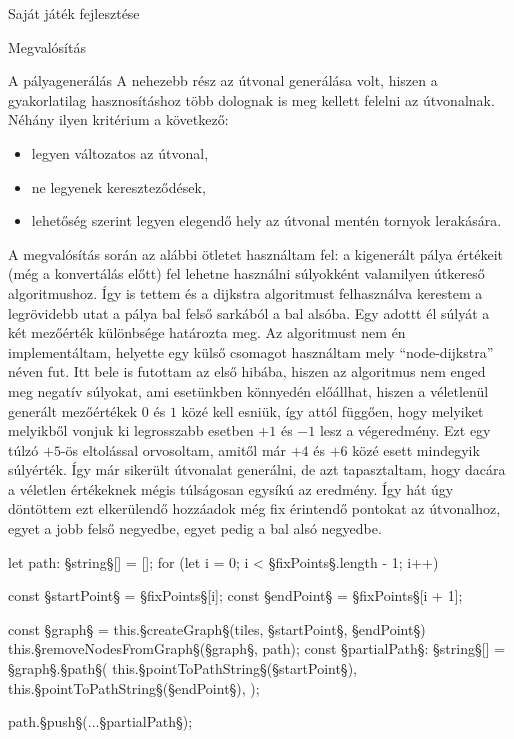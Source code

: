 \begin{MyChapter}{Saját játék fejlesztése}
\begin{MySection}{Megvalósítás}
\begin{MySubSection}{A pályagenerálás}
			A nehezebb rész az útvonal generálása volt, hiszen a gyakorlatilag hasznosításhoz több dolognak is meg kellett felelni az útvonalnak. Néhány ilyen kritérium a következő:
			\begin{itemize}
				\item legyen változatos az útvonal,
				\item ne legyenek kereszteződések,
				\item lehetőség szerint legyen elegendő hely az útvonal mentén tornyok lerakására.
			\end{itemize}
			A megvalósítás során az alábbi ötletet használtam fel: a kigenerált pálya értékeit (még a konvertálás előtt) fel lehetne használni súlyokként valamilyen útkereső algoritmushoz. Így is tettem és a dijkstra algoritmust felhasználva kerestem a legrövidebb utat a pálya bal felső sarkából a bal alsóba. Egy adottt él súlyát a két mezőérték különbsége határozta meg. Az algoritmust nem én implementáltam, helyette egy külső csomagot használtam mely ``node-dijkstra'' néven fut. Itt bele is futottam az első hibába, hiszen az algoritmus nem enged meg negatív súlyokat, ami esetünkben könnyedén előállhat, hiszen a véletlenül generált mezőértékek $0$ és $1$ közé kell esniük, így attól függően, hogy melyiket melyikből vonjuk ki legrosszabb esetben $+1$ és $-1$ lesz a végeredmény. Ezt egy túlzó $+5$-ös eltolással orvosoltam, amitől már $+4$ és $+6$ közé esett mindegyik súlyérték. Így már sikerült útvonalat generálni, de azt tapasztaltam, hogy dacára a véletlen értékeknek mégis túlságosan egysíkú az eredmény. Így hát úgy döntöttem ezt elkerülendő hozzáadok még fix érintendő pontokat az útvonalhoz, egyet a jobb felső negyedbe, egyet pedig a bal alsó negyedbe. 
			\begin{javascript}
let path: §\color{jsType}string§[] = [];
for (let i = 0; i < §\color{jsConst}fixPoints§.length - 1; i++) {
	const §\color{jsConst}startPoint§ = §\color{jsConst}fixPoints§[i];
	const §\color{jsConst}endPoint§ = §\color{jsConst}fixPoints§[i + 1];
	
	const §\color{jsConst}graph§ = this.§\color{jsMethod}createGraph§(tiles, §\color{jsConst}startPoint§, §\color{jsConst}endPoint§)
	this.§\color{jsMethod}removeNodesFromGraph§(§\color{jsConst}graph§, path);
	const §\color{jsConst}partialPath§: §\color{jsType}string§[] = §\color{jsConst}graph§.§\color{jsMethod}path§(
		this.§\color{jsMethod}pointToPathString§(§\color{jsConst}startPoint§),
		this.§\color{jsMethod}pointToPathString§(§\color{jsConst}endPoint§),
	);
	
	path.§\color{jsMethod}push§(...§\color{jsConst}partialPath§);
}


\end{javascript}
\end{MySubSection}
\end{MySection}
\end{MyChapter}
